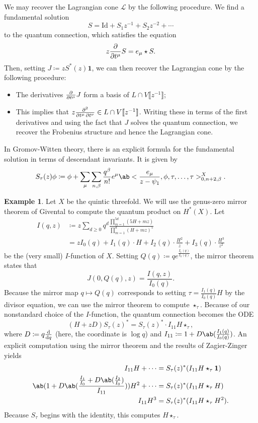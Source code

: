 \documentclass[10pt]{amsart}
\theoremstyle{definition}
\newtheorem{exm}[thm]{Example}
\theoremstyle{remark}
\theoremstyle{plain}
\theoremstyle{definition}
\theoremstyle{remark}
\newcommand{\mc}[1]{\mathcal{#1}}
\newcommand{\mr}[1]{\mathrm{#1}}
\newcommand{\1}{\mathbf{1}}
\newcommand{\2}{\mathbf{2}}
\newcommand{\3}{\mathbf{3}}
\newcommand{\ps}[1]{\llbracket #1 \rrbracket}
\begin{document}
We may recover the Lagrangian cone $\mc{L}$ by the following procedure. We find a fundamental solution 
\[ S = \mr{Id} + S_1 z^{-1} + S_2 z^{-2} + \cdots \]
to the quantum connection, which satisfies the equation
\[ z \pdv{}{t^{\mu}}S = e_{\mu} \star S. \]
Then, setting $J \coloneqq z S^*(z) \1$, we can then recover the Lagrangian cone by the following procedure:
\begin{itemize}
    \item The derivatives $\pdv{}{t^{\mu}} J$ form a basis of $L \cap V\ps{z^{-1}}$;
    \item This implies that $z \pdv{}{t^{\mu},t^{\nu}} \in L \cap V \ps{z^{-1}}$. Writing these in terms of the first derivatives and using the fact that $J$ solves the quantum connection, we recover the Frobenius structure and hence the Lagrangian cone.
\end{itemize}

In Gromov-Witten theory, there is an explicit formula for the fundamental solution in terms of descendant invariants. It is given by
\[ S_{\tau}(z) \phi \coloneqq \phi + \sum_{\mu} \sum_{n,\beta} \frac{q^{\beta}}{n!} e^{\mu} \ab<\frac{e_{\mu}}{z-\psi_1}, \phi, \tau, \ldots, \tau>_{0,n+2,\beta}^{X}. \]

\begin{exm}
    Let $X$ be the quintic threefold. We will use the genus-zero mirror theorem of Givental to compute the quantum product on $H^*(X)$. Let
    \begin{align*}
        I(q,z) &\coloneqq z \sum_{d \geq 0} q^d \frac{\prod_{m=1}^{5d} (5H+mz)}{\prod_{m=1}^d (H+mz)^5}  \\
        &= z I_0(q) + I_1(q) \cdot H + I_2(q) \cdot \frac{H^2}{z} + I_3(q) \cdot \frac{H^3}{z^2}
    \end{align*}
    be the (very small) $I$-function of $X$. Setting $Q(q) \coloneqq q e^{\frac{I_1(q)}{I_0(q)}}$, the mirror theorem states that
    \[ J(0,Q(q),z) = \frac{I(q,z)}{I_0(q)}. \]
    Because the mirror map $q \mapsto Q(q)$ corresponds to setting $\tau = \frac{I_1(q)}{I_0(q)} H$ by the divisor equation, we can use the mirror theorem to compute $\star_{\tau}$. Because of our nonstandard choice of the $I$-function, the quantum connection becomes the ODE
    \[ (H+zD) S_{\tau}(z)^* = S_{\tau}(z)^* \cdot I_{11} H \star_{\tau}, \]
    where $D \coloneqq q \odv{}{q}$ (here, the coordinate is $\log q$) and $I_{11} \coloneqq 1 + D \ab(\frac{I_1(q)}{I_0(q)})$. An explicit computation using the mirror theorem and the results of Zagier-Zinger~\cite{zagierzinger} yields
    \begin{align*}
        I_{11} H + \cdots &= S_{\tau}(z)^* (I_{11} H \star_{\tau} \1) \\
        \ab( 1 + D\ab(\frac{\frac{I_1}{I_0} + D \ab(\frac{I_2}{I_0})}{I_{11}}) ) H^2 + \cdots &= S_{\tau}(z)^* (I_{11} H \star_{\tau} H) \\
        I_{11} H^3 &= S_{\tau}(z)^* (I_{11}H \star_{\tau} H^2).
    \end{align*}
    Because $S_{\tau}$ begins with the identity, this computes $H \star_{\tau}$.
\end{exm}
\end{document}
